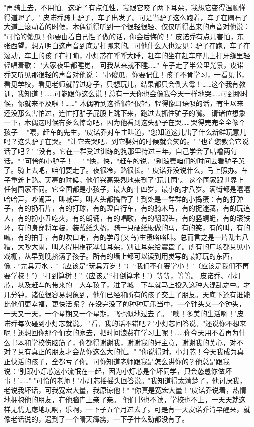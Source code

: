 \documentclass[12pt,UTF8]{ctexbook}
\begin{document}
"再骑上去，不用怕。这驴子有点任性，我跟它咬了两下耳朵，我想它变得温顺懂得道理了。"
皮诺乔骑上驴子，车子出发了。可是当驴子这么跑着，车子在圆石子大道上滚动着的时候，木偶觉得听到一个很轻很轻、仅仅听得出来的声音对他说：
"可怜的傻瓜！你要由着自己性子做的话，你会后悔的！"
皮诺乔有点儿害怕，东张西望，想弄明白这声音到底是打哪来的。可他什么人也没见：驴子在跑，车子在滚动，车上的孩子在打盹，小灯芯在呼呼大睡，赶车的坐在赶车座儿上打牙缝里轻轻唱着歌：
"大家夜里都睡觉，
可我从来就不睡……"
车子走了半公里光景，皮诺乔又听见那很轻的声音对他说：
"小傻瓜，你要记住！孩子不肯学习，一看见书，看见学校，看见老师就背过身子，只想玩儿，结果都只会倒大霉！……这个我有教训，我知道！……可能跟你这么说！总有一天你也会像我今天一样地哭……可到那时候，你就来不及啦！……"
木偶听到这番很轻很轻，轻得像耳语似的话，有生以来还没那么害怕过，连忙打驴子屁股上跳下来，跑过去抓住驴子的嘴。
请诸位想象一下，木偶这时候有多么惊奇吧，因为他看到这头驴子在哭……哭得完完全全像个孩子！
"喂，赶车的先生，"皮诺乔对车主叫道，"您知道这儿出了什么新鲜玩意儿吗？这头驴子在哭。
"让它去哭吧，到它娶妇的时候就会笑的。"
"也许您教会它说话了吧？"
"没有。它在一群受过训练的狗那里待过三年，自己学会了咕噜两句话。"
"可怜的小驴子！……"
"快，快，"赶车的说，"别浪费咱们的时间去看驴子哭了。骑上去吧，咱们要走了。夜很冷，路很长。"
皮诺乔没说什么，马上照办。车子重新上路。天亮的时候，他们兴高采烈地来到了"玩儿国"。
这个国家跟世界上任何国家不同。它全国都是小孩子，最大的十四岁，最小的才八岁。满街都是嘻嘻哈哈声，吵闹声，叫喊声，叫人头都搞昏了！到处是一群群的小捣蛋：有的打弹子，有的扔石片，有的打球，有的蹬自行车，有的骑木马，有的捉迷藏，有的玩追人，有的扮小丑吃火，有的朗诵，有的唱歌，有的翻跟头，有的竖蜻蜓，有的滚铁环，有的身穿将军装，装戴纸头盔，骑一只硬纸板做的马，有的笑，有的叫，有的喊，有的拍手，有的吹口哨，有的学母(又鸟)生蛋咯咯叫。总而言之是一片乱七八糟，大吵大闹，叫人得用棉花塞住耳朵，别让耳朵给震聋了。所有的广场都只见小戏棚，从早到晚挤满了孩子。所有的墙上都可以读到用炭写的最好玩的东西，像：“完具万水：”（应该是“玩具万岁！”）“我们不在要学小！”（应该是我们不再要学校！”）“打到算树！”（应该是“打倒算术！”）等等，等等。
皮诺乔、小灯芯，以及赶车的带来的一大车孩子，进了城一下车就马上投入这种大混乱之中。才几分钟，诸位很容易想象到，他们已经和所有的孩子交上了朋友。天底下还有谁能比他们更幸福，更快活呢？
在没完没了的种种玩乐当中，一个钟头又一个钟头，一天又一天，一个星期又一个星期，飞也似地过去了。
"噢！多美的生活啊！"皮诺乔每次碰到小灯芯就说。
"看，我的话不错吧？"小灯芯回答说，"还说你不想来呢！还想回你那个仙女的家去，把时间浪费在学习上呢！……你今天用不着再为什么书本和学校伤脑筋了，你都得谢谢我，谢谢我的好主意，谢谢我的关心，对不对？只有真正的朋友才会帮你这么大的忙。"
"你说得对，小灯芯！今天我成为真正快活的孩子，全都亏了你。可你知道老师跟我是怎么讲你的？他总是跟我说：'别跟小灯芯这小流氓在一起，因为小灯芯是个坏同学，只会怂恿你做坏事！'……"
"可怜的老师！"小灯芯摇摇头回答说。"我知道得太清楚了，他讨厌我，老说我坏话，可我宽宏大量，我原谅他！"
"你真是宽宏大量！"皮诺乔说着，热情地拥抱他的朋友，在他脑门上亲了亲。
他们书也不读，学校也不上，一天天就这样无忧无虑地玩啊，乐啊，一下子五个月过去了。可是有一天皮诺乔清早醒来，就像老话说的，遇到了一个晴天霹雳，一下子什么劲都没有了。
\end{document}
